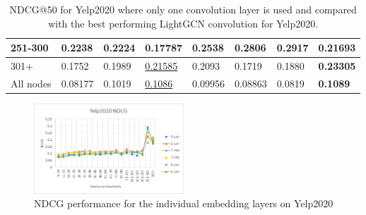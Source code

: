 \begin{table}[]
\begin{tabular}{|l|l|l|l|l|l|l||l|}
        251-300     & 0.2238                         & 0.2224                         & 0.17787                        & 0.2538                         & 0.2806                         & \textbf{0.2917}                 & 0.21693                    \\ \hline
        301+        & 0.1752                         & 0.1989                         & \underline{0.21585}            & 0.2093                         & 0.1719                         & 0.1880                          & \textbf{0.23305}           \\ \hline
        All nodes   & 0.08177                        & 0.1019                         & \underline{0.1086}                         & 0.09956                        & 0.08863                        & 0.0819                          & \textbf{0.1089}            \\ \hline
    \end{tabular}
    \caption{NDCG@50 for Yelp2020 where only one convolution layer is used and compared with the best performing LightGCN convolution for Yelp2020.}
    \label{tab:yelp2020-ndcg-evaluation}
\end{table}

\begin{figure}[]
    \includegraphics[width=0.5\textwidth]{figures/evaluation/yelp-ndcg-evaluation.png}
    \centering
    \caption{NDCG performance for the individual embedding layers on Yelp2020}
    \label{fig:yelp2020-ndcg-individual-evaluation}
\end{figure}

